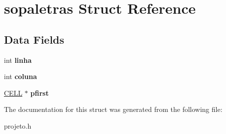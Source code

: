 \hypertarget{structsopaletras}{}\section{sopaletras Struct Reference}
\label{structsopaletras}
\subsection*{Data Fields}
\begin{DoxyCompactItemize}
\item 
\mbox{\label{structsopaletras_af20d02e678ba0aeaf8727d747151baf0}} 
int {\bfseries linha}
\item 
\mbox{\label{structsopaletras_a4a2f44649af1dfbf8d13141d5a336455}} 
int {\bfseries coluna}
\item 
\mbox{\label{structsopaletras_a9454709cf21201113145860ad2eb8631}} 
\mbox{\hyperlink{structcelula}{C\+E\+LL}} $\ast$ {\bfseries pfirst}
\end{DoxyCompactItemize}


The documentation for this struct was generated from the following file\+:\begin{DoxyCompactItemize}
\item 
projeto.\+h\end{DoxyCompactItemize}
